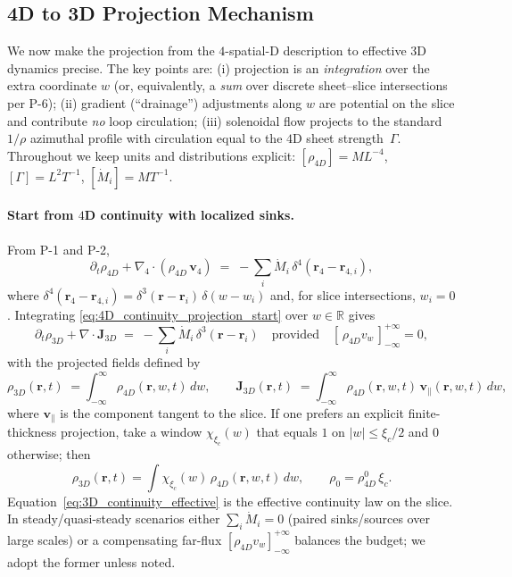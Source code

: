 \subsection{4D to 3D Projection Mechanism}

We now make the projection from the $4$-spatial-D description to effective $3$D dynamics precise. The key points are:
(i) projection is an \emph{integration} over the extra coordinate $w$ (or, equivalently, a \emph{sum} over discrete sheet–slice intersections per P-6);
(ii) gradient (“drainage”) adjustments along $w$ are potential on the slice and contribute \emph{no} loop circulation;
(iii) solenoidal flow projects to the standard $1/\rho$ azimuthal profile with circulation equal to the $4$D sheet strength~$\Gamma$.
Throughout we keep units and distributions explicit: $[\rho_{4D}]=ML^{-4}$, $[\Gamma]=L^2T^{-1}$, $[\dot M_i]=MT^{-1}$.

\paragraph{Start from $4$D continuity with localized sinks.}
From P-1 and P-2,
\begin{equation}
  \partial_t \rho_{4D} + \nabla_4\!\cdot(\rho_{4D}\,\mathbf v_4)
  \;=\; -\sum_i \dot M_i\,\delta^4(\mathbf r_4-\mathbf r_{4,i}),
  \label{eq:4D_continuity_projection_start}
\end{equation}
where $\delta^4(\mathbf r_4-\mathbf r_{4,i})=\delta^3(\mathbf r-\mathbf r_i)\,\delta(w-w_i)$ and, for slice intersections, $w_i=0$.
Integrating \eqref{eq:4D_continuity_projection_start} over $w\in\mathbb R$ gives
\begin{equation}
  \partial_t \rho_{3D} + \nabla\!\cdot \mathbf J_{3D}
  \;=\; -\sum_i \dot M_i\,\delta^3(\mathbf r-\mathbf r_i)
  \quad \text{provided}\quad
  [\,\rho_{4D} v_w\,]_{-\infty}^{+\infty}=0,
  \label{eq:3D_continuity_effective}
\end{equation}
with the projected fields defined by
\begin{equation}
  \rho_{3D}(\mathbf r,t)\;=\!\!\int_{-\infty}^{\infty}\!\! \rho_{4D}(\mathbf r,w,t)\,dw,
  \qquad
  \mathbf J_{3D}(\mathbf r,t)\;=\!\!\int_{-\infty}^{\infty}\!\! \rho_{4D}(\mathbf r,w,t)\,\mathbf v_{\!\parallel}(\mathbf r,w,t)\,dw,
  \label{eq:projection_map_defs}
\end{equation}
where $\mathbf v_{\!\parallel}$ is the component tangent to the slice. If one prefers an explicit finite-thickness projection, take a window $\chi_{\xi_c}(w)$ that equals $1$ on $|w|\le \xi_c/2$ and $0$ otherwise; then
\begin{equation}
  \rho_{3D}(\mathbf r,t)=\int \chi_{\xi_c}(w)\,\rho_{4D}(\mathbf r,w,t)\,dw,
  \qquad
  \rho_0=\rho_{4D}^0\,\xi_c .
  \label{eq:slab_projection}
\end{equation}
Equation~\eqref{eq:3D_continuity_effective} is the effective continuity law on the slice. In steady/quasi-steady scenarios either $\sum_i\dot M_i=0$ (paired sinks/sources over large scales) or a compensating far-flux $[\rho_{4D}v_w]_{-\infty}^{+\infty}$ balances the budget; we adopt the former unless noted.

